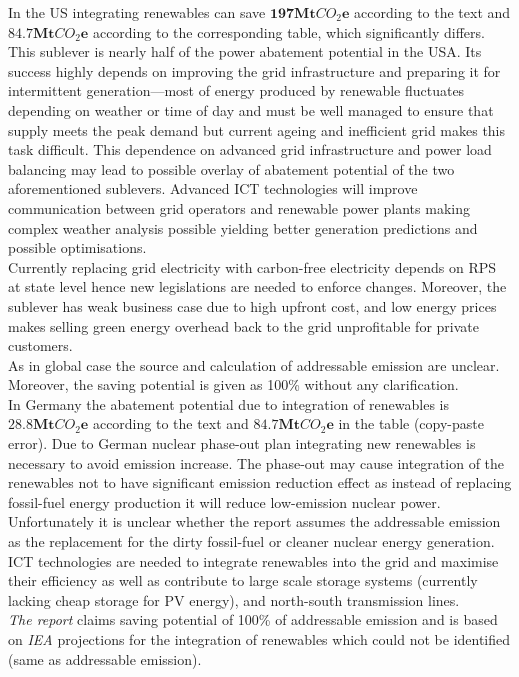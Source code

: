 \documentclass[11pt, twocolumn]{article}
\begin{document}
In the US integrating renewables can save $\mathbf{197} \mathbf{Mt}CO_2\mathbf{e}$ according to the text and $\mathbf{84.7} \mathbf{Mt}CO_2\mathbf{e}$ according to the corresponding table, which significantly differs. This sublever is nearly half of the power abatement potential in the USA. Its success highly depends on improving the grid infrastructure and preparing it for intermittent generation---most of energy produced by renewable fluctuates depending on weather or time of day and must be well managed to ensure that supply meets the peak demand but current ageing and inefficient grid makes this task difficult. This dependence on advanced grid infrastructure and power load balancing may lead to possible overlay of abatement potential of the two aforementioned sublevers. Advanced ICT technologies will improve communication between grid operators and renewable power plants making complex weather analysis possible yielding better generation predictions and possible optimisations.\\
Currently replacing grid electricity with carbon-free electricity depends on RPS at state level hence new legislations are needed to enforce changes. Moreover, the sublever has weak business case due to high upfront cost, and low energy prices makes selling green energy overhead back to the grid unprofitable for private customers.\\
As in global case the source and calculation of addressable emission are unclear. Moreover, the saving potential is given as 100\% without any clarification.\\

In Germany the abatement potential due to integration of renewables is $\mathbf{28.8} \mathbf{Mt}CO_2\mathbf{e}$ according to the text and $\mathbf{84.7} \mathbf{Mt}CO_2\mathbf{e}$ in the table (copy-paste error). Due to German nuclear phase-out plan integrating new renewables is necessary to avoid emission increase. The phase-out may cause integration of the renewables not to have significant emission reduction effect as instead of replacing fossil-fuel energy production it will reduce low-emission nuclear power. Unfortunately it is unclear whether the report assumes the addressable emission as the replacement for the dirty fossil-fuel or cleaner nuclear energy generation.\\
ICT technologies are needed to integrate renewables into the grid and maximise their efficiency as well as contribute to large scale storage systems (currently lacking cheap storage for PV energy), and north-south transmission lines.\\
\emph{The report} claims saving potential of 100\% of addressable emission and is based on \emph{IEA} projections for the integration of renewables which could not be identified (same as addressable emission).\\
\end{document}
